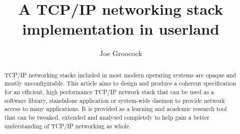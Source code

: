 \documentclass[11pt,a4paper,british]{bhamarticle}
\title{A TCP/IP networking stack implementation in userland}
\author{Joe Groocock}
\begin{document}

\maketitle

\begin{abstract}
    TCP/IP networking stacks included in most modern operating systems are opaque and mostly unconfigurable. This article aims to design and produce a coherent specification for an efficient, high performance TCP/IP network stack that can be used as a software library, standalone application or system-wide daemon to provide network access to many applications. It is provided as a learning and academic research tool that can be tweaked, extended and analysed completely to help gain a better understanding of TCP/IP networking as whole.
\end{abstract}
\end{document}
